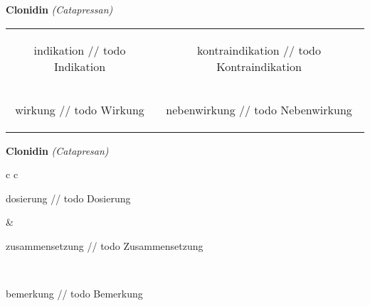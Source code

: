 \documentclass[12pt]{beamer}
\begin{document}
\begin{frame}{
    \textbf{Clonidin}
    \textit{(Catapressan)}
}
    \begin{tabular}{c c}
        \begin{beamercolorbox}[wd=\boxwidth\textwidth,ht=\boxheight\textheight,sep=1em]{indikation}
        // todo Indikation
        \end{beamercolorbox} & 
        \begin{beamercolorbox}[wd=\boxwidth\textwidth,ht=\boxheight\textheight,sep=1em]{kontraindikation}
        // todo Kontraindikation 
        \end{beamercolorbox} \\
        \begin{beamercolorbox}[wd=\boxwidth\textwidth,ht=\boxheight\textheight,sep=1em]{wirkung}
        // todo Wirkung
        \end{beamercolorbox} & 
        \begin{beamercolorbox}[wd=\boxwidth\textwidth,ht=\boxheight\textheight,sep=1em]{nebenwirkung}
        // todo Nebenwirkung
        \end{beamercolorbox} \\
    \end{tabular}
\end{frame}

\begin{frame}{
    \textbf{Clonidin}
    \textit{(Catapresan)}
}
    \begin{tabular}{c c}
        \begin{beamercolorbox}[wd=\boxwidth\textwidth,ht=\boxheight\textheight,sep=1em]{dosierung}
        // todo Dosierung
        \end{beamercolorbox} & 
        \begin{beamercolorbox}[wd=\boxwidth\textwidth,ht=\boxheight\textheight,sep=1em]{zusammensetzung}
        // todo Zusammensetzung
        \end{beamercolorbox} \\
        \begin{beamercolorbox}[wd=\textwidth,ht=\boxheight\textheight,sep=1em]{bemerkung}
        // todo Bemerkung
        \end{beamercolorbox} \\
    \end{tabular}
\end{frame}
\end{document}
